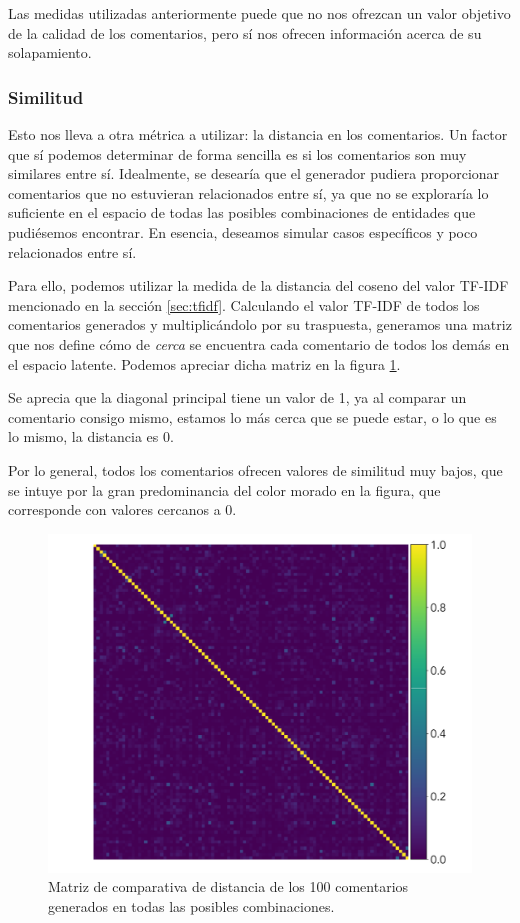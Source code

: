 Las medidas utilizadas anteriormente puede que no nos ofrezcan un valor objetivo de la calidad de los comentarios, pero sí nos ofrecen información acerca de su solapamiento.

\subsubsection{Similitud}
Esto nos lleva a otra métrica a utilizar: la distancia en los comentarios. Un factor que sí podemos determinar de forma sencilla es si los comentarios son muy similares entre sí. Idealmente, se desearía que el generador pudiera proporcionar comentarios que no estuvieran relacionados entre sí, ya que no se exploraría lo suficiente en el espacio de todas las posibles combinaciones de entidades que pudiésemos encontrar. En esencia, deseamos simular casos específicos y poco relacionados entre sí.

Para ello, podemos utilizar la medida de la distancia del coseno del valor TF-IDF mencionado en la sección \ref{sec:tfidf}. Calculando el valor TF-IDF de todos los comentarios generados y multiplicándolo por su traspuesta, generamos una matriz que nos define cómo de \textit{cerca} se encuentra cada comentario de todos los demás en el espacio latente. Podemos apreciar dicha matriz en la figura \ref{fig:conf-tfidf}.

Se aprecia que la diagonal principal tiene un valor de 1, ya al comparar un comentario consigo mismo, estamos lo más cerca que se puede estar, o lo que es lo mismo, la distancia es 0.

Por lo general, todos los comentarios ofrecen valores de similitud muy bajos, que se intuye por la gran predominancia del color morado en la figura, que corresponde con valores cercanos a 0.

\begin{figure}[h]
	\centering
	\includegraphics[width=.6\textwidth]{media/conf_matrix_tfidf.pdf}
	\caption{Matriz de comparativa de distancia de los 100 comentarios generados en todas las posibles combinaciones.}
	\label{fig:conf-tfidf}
\end{figure}



